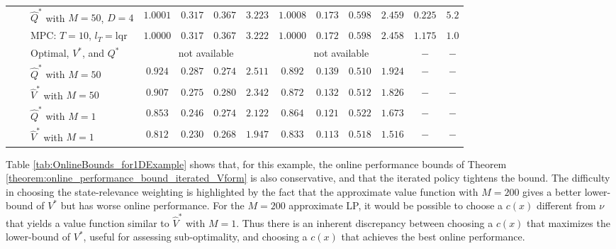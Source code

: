 \documentclass[journal]{IEEEtran}
\newcommand{\mrm}{\mathrm}
\begin{document}
\begin{table*}[t]
\begin{tabular}{|cc|l|cccc|cccc|cc|}
		\\
&& $\hat{Q}^\ast$ with $M=50$, $D=4$ &
		$1.0001$  &  $ 0.317$  &  $ 0.367$  &  $ 3.223$  &
		$1.0008$  &  $ 0.173$  &  $ 0.598$  &  $ 2.459$  &  $   0.225$  &  $     5.2$
		\\
&& MPC: $T=10$, $l_T=\mrm{lqr}$ &
		$1.0000$  &  $ 0.317$  &  $ 0.367$  &  $ 3.222$  &
		$1.0000$  &  $ 0.172$  &  $ 0.598$  &  $ 2.458$  &  $   1.175$  &  $     1.0$
		\\
		\hline\hline
		&&Optimal, $V^\ast$, and $Q^\ast$   &
		\multicolumn{4}{|c|}{not available} &
		\multicolumn{4}{|c|}{not available} &
		$-$ &
		$-$
		\\
		\hline\hline
		\multirow{4}{0.0cm}{\rotatebox{90}{Lower}} &
		\multirow{4}{0.1cm}{\rotatebox{90}{Bound}} &
		$\hat{Q}^\ast$ with $M=50$ &
		$ 0.924$  &  $ 0.287$  &  $ 0.274$  &  $ 2.511$  &
		$ 0.892$  &  $ 0.139$  &  $ 0.510$  &  $ 1.924$  &     $-$  &     $-$
		\\
&& $\hat{V}^\ast$ with $M=50$ &
		$ 0.907$  &  $ 0.275$  &  $ 0.280$  &  $ 2.342$  &
		$ 0.872$  &  $ 0.132$  &  $ 0.512$  &  $ 1.826$  &     $-$  &     $-$
		\\
&& $\hat{Q}^\ast$ with $M=1$ &
		$ 0.853$  &  $ 0.246$  &  $ 0.274$  &  $ 2.122$  &
		$ 0.864$  &  $ 0.121$  &  $ 0.522$  &  $ 1.673$  &     $-$  &     $-$
		\\
&& $\hat{V}^\ast$ with $M=1$ &
		$ 0.812$  &  $ 0.230$  &  $ 0.268$  &  $ 1.947$  &
		$ 0.833$  &  $ 0.113$  &  $ 0.518$  &  $ 1.516$  &     $-$  &     $-$
		\\
		\hline
	\end{tabular}
	
	\label{tab:numerical_results_NDexample}
\end{table*}












Table \ref{tab:OnlineBounds_for1DExample} shows that, for this example, the online performance bounds of Theorem \ref{theorem:online_performance_bound_iterated_Vform} is also conservative, and that the iterated policy tightens the bound.
The difficulty in choosing the state-relevance weighting is highlighted by the fact that the approximate value function with $M\!=\!200$ gives a better lower-bound of $V^\ast$ but has worse online performance.
For the $M\!=\!200$ approximate LP, it would be possible to choose a $c(x)$ different from $\nu$ that yields a value function similar to $\hat{V}^\ast$ with $M\!=\!1$.
Thus there is an inherent discrepancy between choosing a $c(x)$ that maximizes the lower-bound of $V^\ast$, useful for assessing sub-optimality, and choosing a $c(x)$ that achieves the best online performance. 
\end{document}
